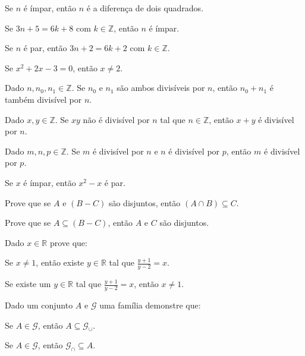 \begin{exerList}
	\item Se $n$ é ímpar, então $n$ é a diferença de dois quadrados.
	\item Se $3n + 5 = 6k + 8$ com $k \in \mathbb{Z}$, então $n$ é ímpar.
	\item Se $n$ é par, então $3n + 2 = 6k + 2$ com $k \in \mathbb{Z}$.
	\item Se $x^2 + 2x - 3 = 0$, então $x \neq 2$.
	\item Dado $n, n_0, n_1 \in \mathbb{Z}$. Se $n_0$ e $n_1$ são ambos divisíveis por $n$, então $n_0 + n_1$ é também divisível por $n$.
	\item Dado $x, y \in \mathbb{Z}$. Se $xy$ não é divisível por $n$ tal que $n \in \mathbb{Z}$, então $x + y$ é divisível por $n$.
	\item Dado $m, n, p \in \mathbb{Z}$. Se $m$ é divisível por $n$ e $n$ é divisível por $p$, então $m$ é divisível por $p$.
	\item Se $x$ é ímpar, então $x^2 - x$ é par.
\end{exerList}

\begin{problem}\label{prob:Demosntracoes2}
	Prove que se $A$ e $(B - C)$ são disjuntos, então $(A \cap B) \subseteq C$.
\end{problem}

\begin{problem}\label{prob:Demosntracoes3}
	Prove que se $A \subseteq (B - C)$, então $A$ e $C$ são disjuntos.
\end{problem}

\begin{problem}\label{prob:Demosntracoes4}
	Dado $x \in \mathbb{R}$ prove que:
\end{problem}

\begin{exerList}
	\item Se $x \neq 1$, então existe $y \in \mathbb{R}$ tal que $\frac{y+1}{y-2} = x$.
	\item Se existe um $y \in \mathbb{R}$ tal que  $\frac{y+1}{y-2} = x$, então $x \neq 1$.
\end{exerList}

\begin{problem}\label{prob:Demosntracoes5}
	Dado um conjunto $A$ e $\mathcal{G}$ uma família demonstre que:
\end{problem}

\begin{exerList}
	\item Se $A \in \mathcal{G}$, então $A \subseteq \mathcal{G}_{\cup}$.
	\item Se $A \in \mathcal{G}$, então $\mathcal{G}_{\cap} \subseteq A$.
\end{exerList}

